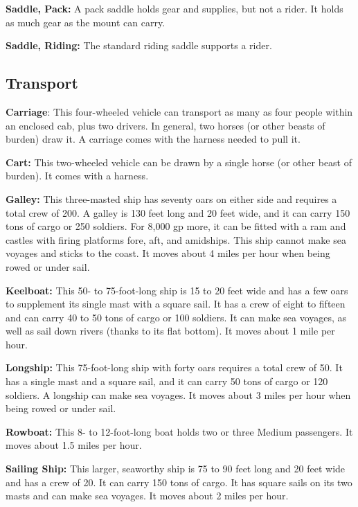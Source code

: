 \begin{multicols}{2}
\textbf{Saddle, Pack:} A pack saddle holds gear and supplies, but not a rider. 
It holds as much gear as the mount can carry.

\textbf{Saddle, Riding:} The standard riding saddle supports a rider.

\subsection{Transport}

\textbf{Carriage}: This four-wheeled vehicle can transport as many as four people 
within an enclosed cab, plus two drivers. In general, two horses (or other beasts 
of burden) draw it. A carriage comes with the harness needed to pull it.

\textbf{Cart:} This two-wheeled vehicle can be drawn by a single horse (or other 
beast of burden). It comes with a harness.

\textbf{Galley:} This three-masted ship has seventy oars on either side and requires 
a total crew of 200. A galley is 130 feet long and 20 feet wide, and it can carry 
150 tons of cargo or 250 soldiers. For 8,000 gp more, it can be fitted with a ram 
and castles with firing platforms fore, aft, and amidships. This ship cannot make 
sea voyages and sticks to the coast. It moves about 4 miles per hour when being 
rowed or under sail.

\textbf{Keelboat:} This 50- to 75-foot-long ship is 15 to 20 feet wide and has 
a few oars to supplement its single mast with a square sail. It has a crew of eight 
to fifteen and can carry 40 to 50 tons of cargo or 100 soldiers. It can make sea 
voyages, as well as sail down rivers (thanks to its flat bottom). It moves about 
1 mile per hour.

\textbf{Longship:} This 75-foot-long ship with forty oars requires a total crew 
of 50. It has a single mast and a square sail, and it can carry 50 tons of cargo 
or 120 soldiers. A longship can make sea voyages. It moves about 3 miles per hour 
when being rowed or under sail.

\textbf{Rowboat:} This 8- to 12-foot-long boat holds two or three Medium passengers. 
It moves about 1.5 miles per hour.

\textbf{Sailing Ship:} This larger, seaworthy ship is 75 to 90 feet long and 20 
feet wide and has a crew of 20. It can carry 150 tons of cargo. It has square sails 
on its two masts and can make sea voyages. It moves about 2 miles per hour.


\end{multicols}
